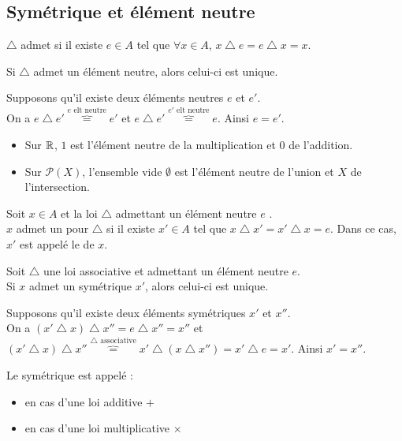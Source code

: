 \documentclass{book}
\begin{document}
\subsection{Symétrique et élément neutre}
\begin{Definition}
$\bigtriangleup$ admet  si il existe $ e\in A$ tel que $\forall x\in A$, $x \bigtriangleup e = e \bigtriangleup x = x$.
\end{Definition}
\begin{Proposition}
Si $\bigtriangleup$ admet un élément neutre, alors celui-ci est unique.
\end{Proposition}
\begin{Demonstration}
Supposons qu'il existe deux éléments neutres $ e$ et $e'$.\\
On a $e \bigtriangleup e'\overbrace{=}^{e \text{ elt neutre}}e'$ et $e \bigtriangleup e'\overbrace{=}^{e' \text{ elt neutre}}e$. Ainsi $ e=e'$.
\end{Demonstration}
\begin{Exemple}
\begin{itemize}
\item Sur $\mathbb{R}$, $1$ est l'élément neutre de la multiplication et $0$ de l'addition.
\item Sur  $\mathcal{P}(X)$, l'ensemble vide $\emptyset$ est l'élément neutre de l'union et  $X$ de  l'intersection.
\end{itemize}
\end{Exemple}

\begin{Definition}
Soit $ x\in A$ et la loi $\bigtriangleup$  admettant  un élément neutre $e$ .\\
$x$ admet un  pour $\bigtriangleup$ si il existe $x'\in A$ tel que $x \bigtriangleup x' = x' \bigtriangleup x = e$. Dans ce cas, $x'$ est appelé le  de $x$.
\end{Definition}
\begin{Proposition}
Soit $\bigtriangleup$ une loi associative et admettant  un élément neutre $e$.\\
Si $x$ admet un symétrique $x'$, alors celui-ci est unique.
\end{Proposition}
\begin{Demonstration}
Supposons qu'il existe deux éléments symétriques $x'$ et $x''$.\\
On a $(x' \bigtriangleup x)\bigtriangleup x''=e\bigtriangleup x''=x''$ et $(x' \bigtriangleup x)\bigtriangleup x''\overbrace{=}^{\bigtriangleup \text{ associative}} x'\bigtriangleup(x\bigtriangleup x'')=x'\bigtriangleup e=x'$.  Ainsi $x'=x''$.
\end{Demonstration}
\begin{Vocabulaire}
Le symétrique est appelé :
\begin{itemize}
\item {} en cas d'une loi additive $+$
\item {} en cas d'une loi multiplicative $\times$
\end{itemize}
\end{Vocabulaire}
\end{document}
